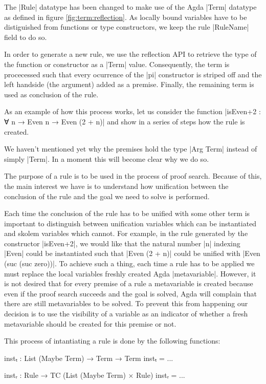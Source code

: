 \documentclass[12pt]{article}
\begin{document}
The |Rule| datatype has been changed to make use of the Agda |Term| datatype as
defined in figure \ref{fig:term:reflection}. As locally bound variables have to
be distiguished from functions or type constructors, we keep the rule |RuleName|
field to do so.

In order to generate a new rule, we use the reflection API to retrieve the type
of the function or constructor as a |Term| value. Consequently, the term is
procecessed such that every ocurrence of the |pi| constructor is striped off and
the left handside (the argument) added as a premise. Finally, the remaining term
is used as conclusion of the rule.

As an example of how this process works, let us consider the function |isEven+2
: ∀ {n} → Even n → Even (2 + n)| and show in a series of steps how the rule is
created.

We haven't mentioned yet why the premises hold the type |Arg Term| instead of
simply |Term|. In a moment this will become clear why we do so.

The purpose of a rule is to be used in the process of proof search. Because of
this, the main interest we have is to understand how unification between the
conclusion of the rule and the goal we need to solve is performed.

Each time the conclusion of the rule has to be unified with some other term is
important to distinguish between unification variables which can be instantiated
and skolem variables which cannot. For example, in the rule generated by the
constructor |isEven+2|, we would like that the natural number |n| indexing
|Even| could be instantiated such that |Even (2 + n)| could be unified with
|Even (suc (suc zero))|. To achieve such a thing, each time a rule has to be
applied we must replace the local variables freshly created Agda |metavariable|.
However, it is not desired that for every premise of a rule a metavariable is
created because even if the proof search succeeds and the goal is solved, Agda
will complain that there are still metavariables to be solved. To prevent this
from happening our decision is to use the visibility of a variable as an
indicator of whether a fresh metavariable should be created for this premise or
not.

This process of intantiating a rule is done by the following functions: 

\begin{code}
  instₜ : List (Maybe Term) → Term → Term
  instₜ = ...

  instᵣ : Rule → TC (List (Maybe Term) × Rule)
  instᵣ = ...
\end{code}
\end{document}
